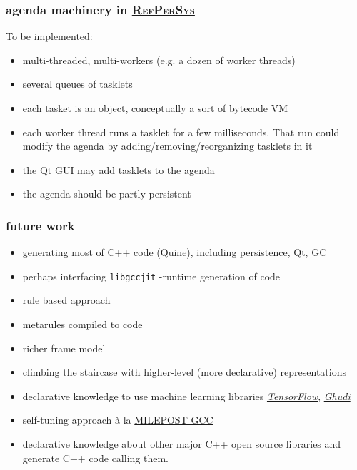 \documentclass[xcolor=svgnames,final,smaller,a4]{beamer}
\newcommand{\RefPerSys}{\href{http://refpersys.org}{\textsc{RefPerSys}}}
\begin{document}
  \begin{frame}
    \frametitle{agenda machinery in \RefPerSys}

    To be implemented:
    
    \begin{itemize}
    \item multi-threaded, multi-workers (e.g. a dozen of worker threads)
    \item several queues of tasklets
    \item each tasket is an object, conceptually a sort of bytecode VM
    \item each worker thread runs a tasklet for a few milliseconds. That run could modify the agenda by adding/removing/reorganizing tasklets in it
    \item the Qt GUI may add tasklets to the agenda
      \item the agenda should be partly persistent
    \end{itemize}
  \end{frame}

  \begin{frame}
    \frametitle{future work}
    \begin{itemize}
    \item generating most of C++ code (Quine), including persistence, Qt, GC
    \item perhaps interfacing \texttt{libgccjit}  -runtime generation of code
    \item rule based approach
    \item metarules compiled to code
    \item richer frame model
    \item climbing the staircase with higher-level (more declarative) representations
    \item declarative knowledge to use machine learning libraries
        \href{https://www.tensorflow.org/}{\textit{TensorFlow}},
        \href{http://gudhi.gforge.inria.fr/}{\textit{Ghudi}}
      \item self-tuning approach à la
        \href{https://en.wikipedia.org/wiki/MILEPOST\_GCC}{MILEPOST
          GCC}
      \item declarative knowledge about other major C++ open source libraries and generate C++ code calling them.
    \end{itemize}
  \end{frame}
 

  
\end{document}
